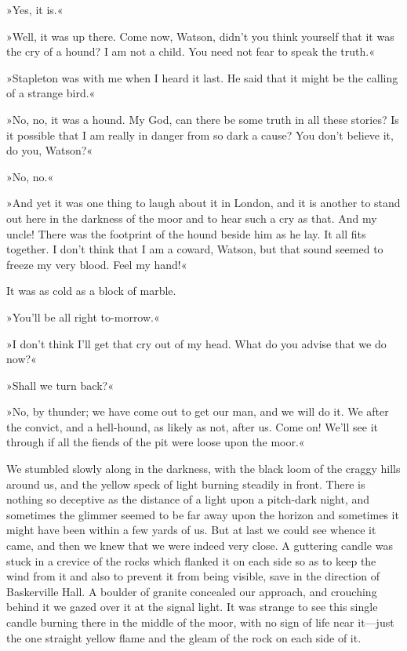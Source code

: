 »Yes, it is.«

»Well, it was up there. Come now, Watson, didn't you think yourself that it was the cry of a hound? I am not a child. You need not fear to speak the truth.«

»Stapleton was with me when I heard it last. He said that it might be the calling of a strange bird.«

»No, no, it was a hound. My God, can there be some truth in all these stories? Is it possible that I am really in danger from so dark a cause? You don't believe it, do you, Watson?«

»No, no.«

»And yet it was one thing to laugh about it in London, and it is another to stand out here in the darkness of the moor and to hear such a cry as that. And my uncle! There was the footprint of the hound beside him as he lay. It all fits together. I don't think that I am a coward, Watson, but that sound seemed to freeze my very blood. Feel my hand!«

It was as cold as a block of marble.

»You'll be all right to-morrow.«

»I don't think I'll get that cry out of my head. What do you advise that we do now?«

»Shall we turn back?«

»No, by thunder; we have come out to get our man, and we will do it. We after the convict, and a hell-hound, as likely as not, after us. Come on! We'll see it through if all the fiends of the pit were loose upon the moor.«

We stumbled slowly along in the darkness, with the black loom of the craggy hills around us, and the yellow speck of light burning steadily in front. There is nothing so deceptive as the distance of a light upon a pitch-dark night, and sometimes the glimmer seemed to be far away upon the horizon and sometimes it might have been within a few yards of us. But at last we could see whence it came, and then we knew that we were indeed very close. A guttering candle was stuck in a crevice of the rocks which flanked it on each side so as to keep the wind from it and also to prevent it from being visible, save in the direction of Baskerville Hall. A boulder of granite concealed our approach, and crouching behind it we gazed over it at the signal light. It was strange to see this single candle burning there in the middle of the moor, with no sign of life near it—just the one straight yellow flame and the gleam of the rock on each side of it.



